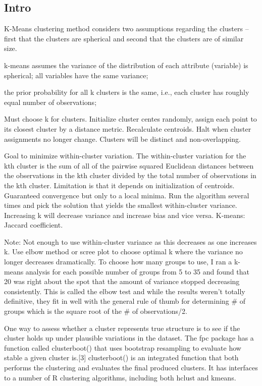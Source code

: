 \documentclass[]{book}
\theoremstyle{definition}
\theoremstyle{definition}
\theoremstyle{definition}
\theoremstyle{remark}
\begin{document}
\subsection{Intro}\label{intro-5}

K-Means clustering method considers two assumptions regarding the
clusters -- first that the clusters are spherical and second that the
clusters are of similar size.

k-means assumes the variance of the distribution of each attribute
(variable) is spherical; all variables have the same variance;

the prior probability for all k clusters is the same, i.e., each cluster
has roughly equal number of observations;

Must choose k for clusters. Initialize cluster centes randomly, assign
each point to its closest cluster by a distance metric. Recalculate
centroids. Halt when cluster assignments no longer change. Clusters will
be distinct and non-overlapping.

Goal to minimize within-cluster variation. The within-cluster variation
for the kth cluster is the sum of all of the pairwise squared Euclidean
distances between the observations in the kth cluster divided by the
total number of observations in the kth cluster. Limitation is that it
depends on initialization of centroids. Guaranteed convergence but only
to a local minima. Run the algorithm several times and pick the solution
that yields the smallest within-cluster variance. Increasing k will
decrease variance and increase bias and vice versa. K-means: Jaccard
coefficient.

Note: Not enough to use within-cluster variance as this decreases as one
increases k. Use elbow method or scree plot to choose optimal k where
the variance no longer decreases dramatically. To choose how many groups
to use, I ran a k-means analysis for each possible number of groups from
5 to 35 and found that 20 was right about the spot that the amount of
variance stopped decreasing consistently. This is called the elbow test
and while the results weren't totally definitive, they fit in well with
the general rule of thumb for determining \# of groups which is the
square root of the \# of observations/2.

One way to assess whether a cluster represents true structure is to see
if the cluster holds up under plausible variations in the dataset. The
fpc package has a function called clusterboot() that uses bootstrap
resampling to evaluate how stable a given cluster is.{[}3{]}
clusterboot() is an integrated function that both performs the
clustering and evaluates the final produced clusters. It has interfaces
to a number of R clustering algorithms, including both hclust and
kmeans.
\end{document}
